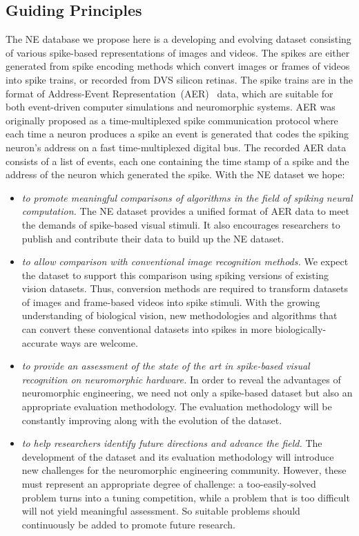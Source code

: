 \subsection{Guiding Principles}
The NE database we propose here is a developing and evolving dataset consisting of various spike-based representations of images and videos.
The spikes are either generated from spike encoding methods which convert images or frames of videos into spike trains, or recorded from DVS silicon retinas.
The spike trains are in the format of Address-Event Representation~(AER)~\cite{mahowald1992vlsi} data, which are suitable for both event-driven computer simulations and neuromorphic systems.
AER was originally proposed as a time-multiplexed spike communication protocol where each time a neuron produces a spike an event is generated that codes the spiking neuron's address on a fast time-multiplexed digital bus.
The recorded AER data consists of a list of events, each one containing the time stamp of a spike and the address of the neuron which generated the spike.
With the NE dataset we hope:
\begin{itemize}
	\item \textit{to promote meaningful comparisons of algorithms in the field of spiking neural computation.}
	The NE dataset provides a unified format of AER data to meet the demands of spike-based visual stimuli.
	It also encourages researchers to publish and contribute their data to build up the NE dataset.
	\item \textit{to allow comparison with conventional image recognition methods.}
	We expect the dataset to support this comparison using spiking versions of existing vision datasets.
	Thus, conversion methods are required to transform datasets of images and frame-based videos into spike stimuli.
	With the growing understanding of biological vision, new methodologies and algorithms that can convert these conventional datasets into spikes in more biologically-accurate ways are welcome.
	\item \textit{to provide an assessment of the state of the art in spike-based visual recognition on neuromorphic hardware.}
	In order to reveal the advantages of neuromorphic engineering, we need not only a spike-based dataset but also an appropriate evaluation methodology.
	The evaluation methodology will be constantly improving along with the evolution of the dataset.
	\item \textit{to help researchers identify future directions and advance the field.}
	The development of the dataset and its evaluation methodology will introduce new challenges for the neuromorphic engineering community.
	However, these must represent an appropriate degree of challenge: a too-easily-solved problem turns into a tuning competition, while a problem that is too difficult will not yield meaningful assessment.
	So suitable problems should continuously be added to promote future research.  
\end{itemize}


